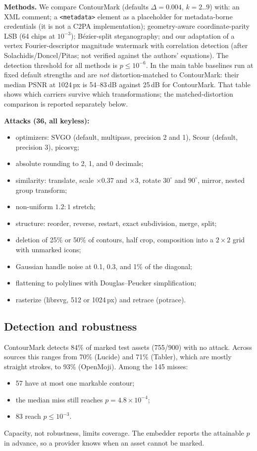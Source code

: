 \documentclass[10pt,twocolumn]{article}
\newcommand{\system}{ContourMark}
\begin{document}
\textbf{Methods.} We compare \system{} (defaults $\Delta{=}0.004$, $k{=}2..9$) with: an XML comment; a \texttt{<metadata>} element as a placeholder for metadata-borne credentials (it is not a C2PA implementation); geometry-aware coordinate-parity LSB (64 chips at $10^{-3}$); Bézier-split steganography; and our adaptation of a vertex Fourier-descriptor magnitude watermark with correlation detection (after Solachidis/Doncel/Pitas; not verified against the authors' equations). The detection threshold for all methods is $p\le10^{-6}$. In the main table baselines run at fixed default strengths and are \emph{not} distortion-matched to \system{}: their median PSNR at 1024\,px is 54--83\,dB against 25\,dB for \system{}. That table shows which carriers survive which transformations; the matched-distortion comparison is reported separately below.

\textbf{Attacks (36, all keyless):}
\begin{itemize}
\item optimizers: SVGO (default, multipass, precision 2 and 1), Scour (default, precision 3), picosvg;
\item absolute rounding to 2, 1, and 0 decimals;
\item similarity: translate, scale $\times0.37$ and $\times3$, rotate $30^\circ$ and $90^\circ$, mirror, nested group transform;
\item non-uniform $1.2{:}1$ stretch;
\item structure: reorder, reverse, restart, exact subdivision, merge, split;
\item deletion of 25\% or 50\% of contours, half crop, composition into a $2{\times}2$ grid with unmarked icons;
\item Gaussian handle noise at 0.1, 0.3, and 1\% of the diagonal;
\item flattening to polylines with Douglas--Peucker simplification;
\item rasterize (librsvg, 512 or 1024\,px) and retrace (potrace).
\end{itemize}

\subsection{Detection and robustness}
\system{} detects 84\% of marked test assets (755/900) with no attack. Across sources this ranges from 70\% (Lucide) and 71\% (Tabler), which are mostly straight strokes, to 93\% (OpenMoji). Among the 145 misses:
\begin{itemize}
\item 57 have at most one markable contour;
\item the median miss still reaches $p=4.8\times10^{-4}$;
\item 83 reach $p\le10^{-3}$.
\end{itemize}
Capacity, not robustness, limits coverage. The embedder reports the attainable $p$ in advance, so a provider knows when an asset cannot be marked.
\end{document}
